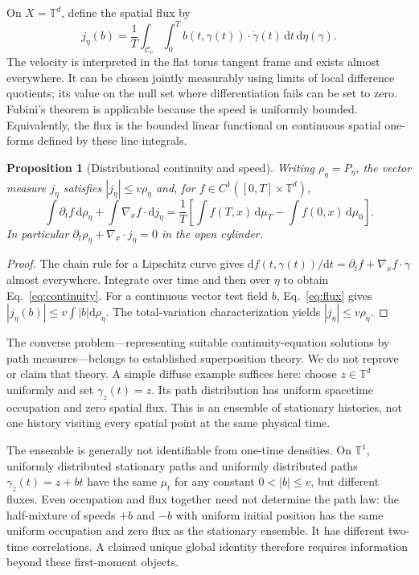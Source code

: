 \documentclass[aip,jmp,reprint,onecolumn,amsmath,amssymb]{revtex4-2}
\newcommand{\dd}{\mathrm{d}}
\newcommand{\T}{\mathbb T}
\newcommand{\C}{\mathcal C}
\newtheorem{proposition}[theorem]{Proposition}
\theoremstyle{definition}
\begin{document}
On $X=\T^d$, define the spatial flux by
\begin{equation}
 j_\eta(b)=\frac1T\int_{\C_v}\int_0^T b(t,\gamma(t))\cdot\dot\gamma(t)\,\dd t\,\dd\eta(\gamma).
 \label{eq:flux}
\end{equation}
The velocity is interpreted in the flat torus tangent frame and exists almost everywhere. It can be chosen jointly measurably using limits of local difference quotients; its value on the null set where differentiation fails can be set to zero. Fubini's theorem is applicable because the speed is uniformly bounded. Equivalently, the flux is the bounded linear functional on continuous spatial one-forms defined by these line integrals.

\begin{proposition}[Distributional continuity and speed]
Writing $\rho_\eta=P_\eta$, the vector measure $j_\eta$ satisfies $|j_\eta|\le v\rho_\eta$ and, for $f\in C^1([0,T]\times\T^d)$,
\begin{equation}
 \int\partial_t f\,\dd\rho_\eta+\int\nabla_xf\cdot\dd j_\eta
 =\frac1T\left[\int f(T,x)\,\dd\mu_T-\int f(0,x)\,\dd\mu_0\right].
 \label{eq:continuity}
\end{equation}
In particular $\partial_t\rho_\eta+\nabla_x\cdot j_\eta=0$ in the open cylinder.
\end{proposition}
\begin{proof}
The chain rule for a Lipschitz curve gives $\dd f(t,\gamma(t))/\dd t=\partial_t f+\nabla_xf\cdot\dot\gamma$ almost everywhere. Integrate over time and then over $\eta$ to obtain Eq.~\eqref{eq:continuity}. For a continuous vector test field $b$, Eq.~\eqref{eq:flux} gives $|j_\eta(b)|\le v\int|b|\dd\rho_\eta$. The total-variation characterization yields $|j_\eta|\le v\rho_\eta$.
\end{proof}
The converse problem---representing suitable continuity-equation solutions by path measures---belongs to established superposition theory.\cite{stepanov,miller} We do not reprove or claim that theory. A simple diffuse example suffices here: choose $z\in\T^d$ uniformly and set $\gamma_z(t)=z$. Its path distribution has uniform spacetime occupation and zero spatial flux. This is an ensemble of stationary histories, not one history visiting every spatial point at the same physical time.

The ensemble is generally not identifiable from one-time densities. On $\T^1$, uniformly distributed stationary paths and uniformly distributed paths $\gamma_z(t)=z+bt$ have the same $\mu_t$ for any constant $0<|b|\le v$, but different fluxes. Even occupation and flux together need not determine the path law: the half-mixture of speeds $+b$ and $-b$ with uniform initial position has the same uniform occupation and zero flux as the stationary ensemble. It has different two-time correlations. A claimed unique global identity therefore requires information beyond these first-moment objects.
\end{document}
